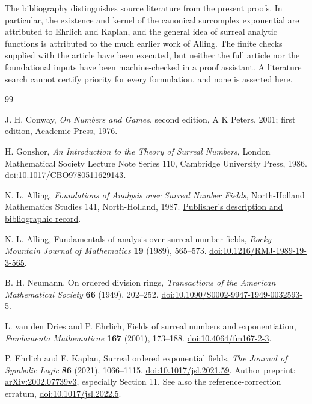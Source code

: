 \documentclass[11pt,oneside]{article}
\numberwithin{equation}{section}
\theoremstyle{definition}
\theoremstyle{remark}\newtheorem{remark}[theorem]{Remark}
\begin{document}
The bibliography distinguishes source literature from the present proofs.
In particular, the existence and kernel of the canonical surcomplex
exponential are attributed to Ehrlich and Kaplan, and the general idea of
surreal analytic functions is attributed to the much earlier work of
Alling. The finite checks supplied with the article have been executed,
but neither the full article nor the foundational inputs have been
machine-checked in a proof assistant. A literature search cannot certify
priority for every formulation, and none is asserted here.

\begin{thebibliography}{99}
\raggedright
{}
J. H. Conway, \emph{On Numbers and Games}, second edition,
A K Peters, 2001; first edition, Academic Press, 1976.

H. Gonshor, \emph{An Introduction to the Theory of Surreal Numbers},
London Mathematical Society Lecture Note Series 110,
Cambridge University Press, 1986.
\href{https://doi.org/10.1017/CBO9780511629143}{doi:10.1017/CBO9780511629143}.

N. L. Alling, \emph{Foundations of Analysis over Surreal Number Fields},
North-Holland Mathematics Studies 141, North-Holland, 1987.
\href{https://shop.elsevier.com/books/foundations-of-analysis-over-surreal-number-fields/alling/978-0-444-70226-5}{Publisher's description and bibliographic record}.

N. L. Alling, Fundamentals of analysis over surreal number fields,
\emph{Rocky Mountain Journal of Mathematics} \textbf{19} (1989), 565--573.
\href{https://doi.org/10.1216/RMJ-1989-19-3-565}{doi:10.1216/RMJ-1989-19-3-565}.

B. H. Neumann, On ordered division rings,
\emph{Transactions of the American Mathematical Society}
\textbf{66} (1949), 202--252.
\href{https://doi.org/10.1090/S0002-9947-1949-0032593-5}{doi:10.1090/S0002-9947-1949-0032593-5}.

L. van den Dries and P. Ehrlich, Fields of surreal numbers and
exponentiation, \emph{Fundamenta Mathematicae} \textbf{167} (2001), 173--188.
\href{https://doi.org/10.4064/fm167-2-3}{doi:10.4064/fm167-2-3}.

P. Ehrlich and E. Kaplan, Surreal ordered exponential fields,
\emph{The Journal of Symbolic Logic} \textbf{86} (2021), 1066--1115.
\href{https://doi.org/10.1017/jsl.2021.59}{doi:10.1017/jsl.2021.59}.
Author preprint: \href{https://arxiv.org/abs/2002.07739}{arXiv:2002.07739v3},
especially Section 11. See also the reference-correction erratum,
\href{https://doi.org/10.1017/jsl.2022.5}{doi:10.1017/jsl.2022.5}.


\end{thebibliography}
\end{document}
